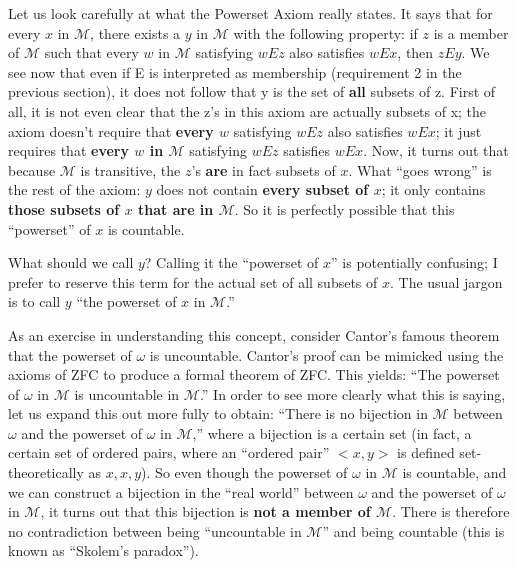 \documentclass[10pt]{article}
\begin{document}
Let us look carefully at what the Powerset Axiom really states. It says that for every $x$ in $\mathcal M$, there exists a $y$ in $\mathcal{M}$ with the following property: if $z$ is a member of $\mathcal{M}$ such that every $w$ in $\mathcal{M}$ satisfying $w E z$ also satisfies $w E x$, then $z E y$. We see now that even if E is interpreted as membership (requirement 2 in the previous section), it does not follow that y is the set of \textbf{all} subsets of z. First of all, it is not even clear that the z's in this axiom are actually subsets of x; the axiom doesn't require that \textbf{every $w$} satisfying $w E z$ also satisfies $w E x$; it just requires that \textbf{every $w$ in $\mathcal M$} satisfying $w E z$ satisfies $w E x$. Now, it turns out that because $\mathcal{M}$ is transitive, the $z$'s \textbf{are} in fact subsets of $x$. What ``goes wrong'' is the rest of the axiom: $y$ does not contain \textbf{every subset of $x$}; it only contains \textbf{those subsets of $x$ that are in $\mathcal M$}. So it is perfectly possible that this ``powerset'' of $x$ is countable.

What should we call $y$? Calling it the ``powerset of $x$'' is potentially confusing; I prefer to reserve this term for the actual set of all subsets of $x$. The usual jargon is to call $y$ ``the powerset of $x$ in $\mathcal M$.''

As an exercise in understanding this concept, consider Cantor's famous theorem that the powerset of $\omega$ is uncountable. Cantor's proof can be mimicked using the axioms of ZFC to produce a formal theorem of ZFC. This yields: ``The powerset of $\omega$ in $\mathcal{M}$ is uncountable in $\mathcal M$.'' In order to see more clearly what this is saying, let us expand this out more fully to obtain: ``There is no bijection in $\mathcal{M}$ between $\omega$ and the powerset of $\omega$ in $\mathcal M$,'' where a bijection is a certain set (in fact, a certain set of ordered pairs, where an ``ordered pair'' $<x,y>$ is defined set-theoretically as ${{x}, {x,y}}$). So even though the powerset of $\omega$ in $\mathcal{M}$ is countable, and we can construct a bijection in the ``real world'' between $\omega$ and the powerset of $\omega$ in $\mathcal M$, it turns out that this bijection is \textbf{not a member of $\mathcal M$}. There is therefore no contradiction between being ``uncountable in $\mathcal M$'' and being countable (this is known as ``Skolem's paradox'').
\end{document}
